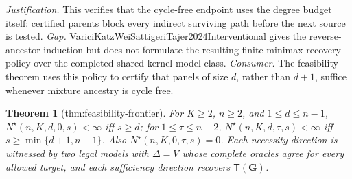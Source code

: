 \documentclass{article}
\newtheorem{theorem}{Theorem}
\begin{document}
\par\smallskip\noindent \textit{Justification.} This verifies that the cycle-free endpoint uses the degree budget itself: certified parents block every indirect surviving path before the next source is tested. \textit{Gap.} VariciKatzWeiSattigeriTajer2024Interventional gives the reverse-ancestor induction but does not formulate the resulting finite minimax recovery policy over the completed shared-kernel model class. \textit{Consumer.} The feasibility theorem uses this policy to certify that panels of size \(d\), rather than \(d+1\), suffice whenever mixture ancestry is cycle free.

\begin{theorem}[thm:feasibility-frontier]\label{thm:feasibility-frontier}
For \(K\ge2\), \(n\ge2\), and \(1\le d\le n-1\), \(N^{\star}(n,K,d,0,s)<\infty\) iff \(s\ge d\); for \(1\le\tau\le n-2\), \(N^{\star}(n,K,d,\tau,s)<\infty\) iff \(s\ge\min\{d+1,n-1\}\). Also \(N^{\star}(n,K,0,\tau,s)=0\). Each necessity direction is witnessed by two legal models with \(\Delta=V\) whose complete oracles agree for every allowed target, and each sufficiency direction recovers \(\mathsf T(\mathbf G)\).
\end{theorem}
\end{document}
